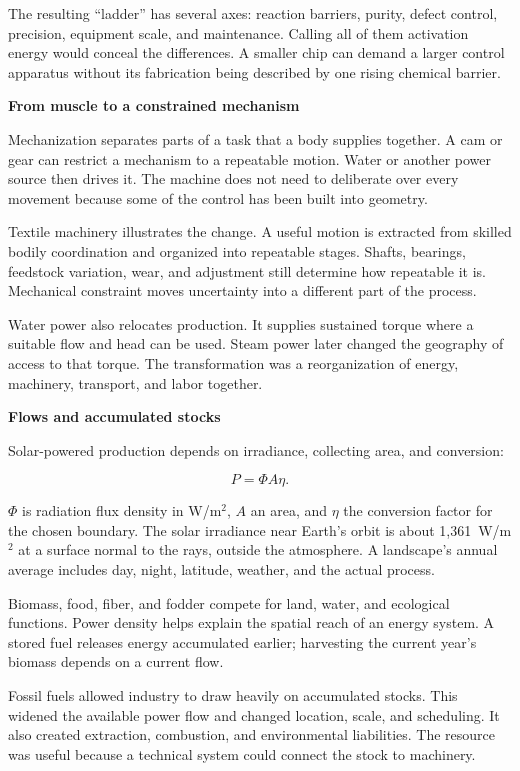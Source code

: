 \documentclass[11pt,openany]{book}
\newcommand{\subhead}[1]{\par\medskip\noindent\textbf{#1}\par\nobreak\smallskip}
\begin{document}
The resulting “ladder” has several axes: reaction barriers, purity, defect control, precision, equipment scale, and maintenance. Calling all of them activation energy would conceal the differences. A smaller chip can demand a larger control apparatus without its fabrication being described by one rising chemical barrier.

\subhead{From muscle to a constrained mechanism}

Mechanization separates parts of a task that a body supplies together. A cam or gear can restrict a mechanism to a repeatable motion. Water or another power source then drives it. The machine does not need to deliberate over every movement because some of the control has been built into geometry.

Textile machinery illustrates the change. A useful motion is extracted from skilled bodily coordination and organized into repeatable stages. Shafts, bearings, feedstock variation, wear, and adjustment still determine how repeatable it is. Mechanical constraint moves uncertainty into a different part of the process.

Water power also relocates production. It supplies sustained torque where a suitable flow and head can be used. Steam power later changed the geography of access to that torque. The transformation was a reorganization of energy, machinery, transport, and labor together.\cite{smil2017energy}

\subhead{Flows and accumulated stocks}

Solar-powered production depends on irradiance, collecting area, and conversion:

\begin{equation}
P=\Phi A\eta.
\end{equation}

$\Phi$ is radiation flux density in W/m$^2$, $A$ an area, and $\eta$ the conversion factor for the chosen boundary. The solar irradiance near Earth's orbit is about 1,361~W/m$^2$ at a surface normal to the rays, outside the atmosphere.\cite{prsa2016nominal} A landscape's annual average includes day, night, latitude, weather, and the actual process.

Biomass, food, fiber, and fodder compete for land, water, and ecological functions. Power density helps explain the spatial reach of an energy system.\cite{smil2015power} A stored fuel releases energy accumulated earlier; harvesting the current year's biomass depends on a current flow.

Fossil fuels allowed industry to draw heavily on accumulated stocks. This widened the available power flow and changed location, scale, and scheduling. It also created extraction, combustion, and environmental liabilities. The resource was useful because a technical system could connect the stock to machinery.
\end{document}
